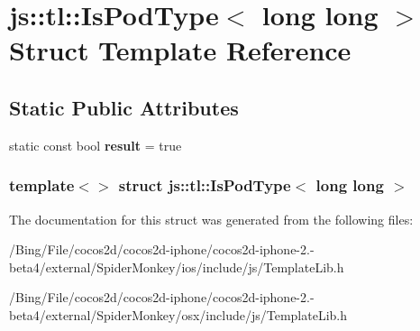 \hypertarget{structjs_1_1tl_1_1_is_pod_type_3_01long_01long_01_4}{\section{js\-:\-:tl\-:\-:Is\-Pod\-Type$<$ long long $>$ Struct Template Reference}
\label{structjs_1_1tl_1_1_is_pod_type_3_01long_01long_01_4}
}
\subsection*{Static Public Attributes}
\begin{DoxyCompactItemize}
\item 
\hypertarget{structjs_1_1tl_1_1_is_pod_type_3_01long_01long_01_4_a774c04f8d977c9cc6210d4727ff3c31e}{static const bool {\bfseries result} = true}\label{structjs_1_1tl_1_1_is_pod_type_3_01long_01long_01_4_a774c04f8d977c9cc6210d4727ff3c31e}

\end{DoxyCompactItemize}
\subsubsection*{template$<$$>$ struct js\-::tl\-::\-Is\-Pod\-Type$<$ long long $>$}



The documentation for this struct was generated from the following files\-:\begin{DoxyCompactItemize}
\item 
/\-Bing/\-File/cocos2d/cocos2d-\/iphone/cocos2d-\/iphone-\/2.-\/beta4/external/\-Spider\-Monkey/ios/include/js/Template\-Lib.\-h\item 
/\-Bing/\-File/cocos2d/cocos2d-\/iphone/cocos2d-\/iphone-\/2.-\/beta4/external/\-Spider\-Monkey/osx/include/js/Template\-Lib.\-h\end{DoxyCompactItemize}
